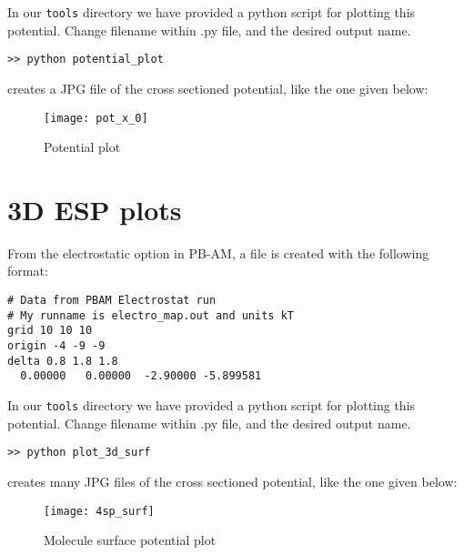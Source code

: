 \medskip

In our \texttt{tools} directory we have provided a python script for plotting this potential.
Change filename within .py file, and the desired output name.
\begin{lstlisting}[style = MyBash]
>> python potential_plot
\end{lstlisting}

\medskip

creates a JPG file of the cross sectioned potential, like the one given below:

\begin{figure}[!htbp]
  \centering
    \texttt{[image: pot\_x\_0]}
    \caption{Potential plot}
\end{figure}

\section{3D ESP plots}
From the electrostatic option in PB-AM, a file is created with the following format: \\

\begin{lstlisting}[style = MyBash]
# Data from PBAM Electrostat run
# My runname is electro_map.out and units kT
grid 10 10 10
origin -4 -9 -9
delta 0.8 1.8 1.8
  0.00000   0.00000  -2.90000 -5.899581 
\end{lstlisting}

\medskip

In our \texttt{tools} directory we have provided a python script for plotting this potential.
Change filename within .py file, and the desired output name.
\begin{lstlisting}[style = MyBash]
>> python plot_3d_surf
\end{lstlisting}

\medskip

creates many JPG files of the cross sectioned potential, like the one given below:

\begin{figure}[!htbp]
  \centering
    \texttt{[image: 4sp\_surf]}
    \caption{Molecule surface potential plot}
\end{figure}

